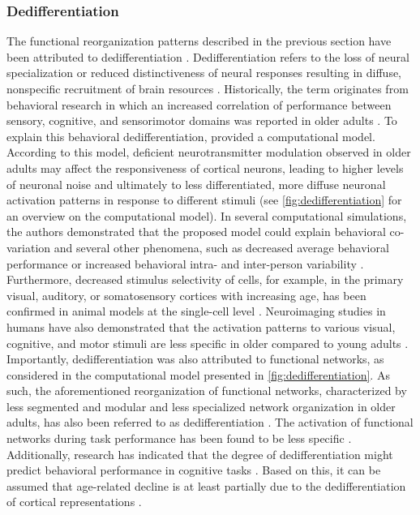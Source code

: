 \subsubsection{Dedifferentiation}
\label{theory:aging:dedif}
The functional reorganization patterns described in the previous section have been attributed to dedifferentiation \cite{Grady2012}. Dedifferentiation refers to the loss of neural specialization or reduced distinctiveness of neural responses resulting in diffuse, nonspecific recruitment of brain resources \cite{Koen2019}. Historically, the term originates from behavioral research in which an increased correlation of performance between sensory, cognitive, and sensorimotor domains was reported in older adults \cite{Baltes1997,Li2002}. To explain this behavioral dedifferentiation, \citeauthor{Li2000} \cite{Li2000, Li2001} provided a computational model. According to this model, deficient neurotransmitter modulation observed in older adults may affect the responsiveness of cortical neurons, leading to higher levels of neuronal noise and ultimately to less differentiated, more diffuse neuronal activation patterns in response to different stimuli \cite{Li2000,Li2001} (see \autoref{fig:dedifferentiation} for an overview on the computational model). In several computational simulations, the authors demonstrated that the proposed model could explain behavioral co-variation and several other phenomena, such as decreased average behavioral performance or increased behavioral intra- and inter-person variability \cite{Li2000,Li2002}. Furthermore, decreased stimulus selectivity of cells, for example, in the primary visual, auditory, or somatosensory cortices with increasing age, has been confirmed in animal models at the single-cell level \cite{Koen2019, Schmolesky2000, Costa2016, Spengler1995}. Neuroimaging studies in humans have also demonstrated that the activation patterns to various visual, cognitive, and motor stimuli are less specific in older compared to young adults \cite{Tucker2019, Koen2019,Carb2011}. Importantly, dedifferentiation was also attributed to functional networks, as considered in the computational model presented in \autoref{fig:dedifferentiation}. As such, the aforementioned reorganization of functional networks, characterized by less segmented and modular and less specialized network organization in older adults, has also been referred to as dedifferentiation \cite{Deery2023, Koen2019, Sala-Llonch2015}. The activation of functional networks during task performance has been found to be less specific \cite{Rieck2021,Geerligs2014,Antonenko2013}. Additionally, research has indicated that the degree of dedifferentiation might predict behavioral performance in cognitive tasks \cite{Koen2019}. Based on this, it can be assumed that age-related decline is at least partially due to the dedifferentiation of cortical representations \cite{Koen2019}.

